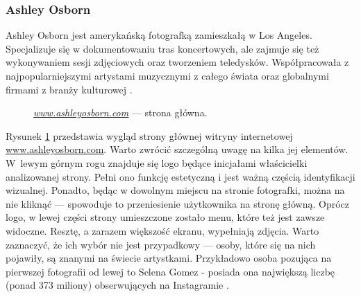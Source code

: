 \documentclass[a4paper, 12pt]{article}
\numberwithin{figure}{section}
\begin{document}
\begin{sloppypar}

\subsubsection{Ashley Osborn} \label{ashley}

Ashley Osborn jest amerykańską fotografką zamieszkałą w Los Angeles. Specjalizuje się w dokumentowaniu tras koncertowych, ale zajmuje się też wykonywaniem sesji zdjęciowych oraz tworzeniem teledysków. Współpracowała z najpopularniejszymi artystami muzycznymi z całego świata oraz globalnymi firmami z branży kulturowej \cite{ashley}. 

\begin{figure}[H] 
    \centering
   \caption{\textit{\url{www.ashleyosborn.com}} --- strona główna.}
   \label{fig:ashley-1.jpg}
\end{figure}

Rysunek \ref{fig:ashley-1.jpg} przedstawia wygląd strony głównej witryny internetowej \url{www.ashleyosborn.com}. Warto zwrócić szczególną uwagę na kilka jej elementów. W~lewym górnym rogu znajduje się logo będące inicjałami właścicielki analizowanej strony. Pełni ono funkcję estetyczną i jest ważną częścią identyfikacji wizualnej. Ponadto, będąc w dowolnym miejscu na stronie fotografki, można na nie kliknąć --- spowoduje to przeniesienie użytkownika na stronę główną. Oprócz logo, w lewej części strony umieszczone zostało menu, które też jest zawsze widoczne. Resztę, a zarazem większość ekranu, wypełniają zdjęcia. Warto zaznaczyć, że ich wybór nie jest przypadkowy --- osoby, które się na nich pojawiły, są znanymi na świecie artystkami. Przykładowo osoba pozująca na pierwszej fotografii od lewej to Selena Gomez - posiada ona największą liczbę (ponad 373 miliony) obserwujących na Instagramie \cite{instagram}. 


\end{sloppypar}
\end{document}
